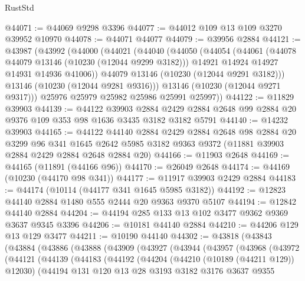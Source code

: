 \begin{lexlean}{RustStd}
\begin{coremodule}
@44071 := @44069 @9298 @3396
@44077 := @44012 @109 @13 @109 @3270 @39952 @10970
@44078 := @44071 @44077
@44079 := @39956 @2884
@44121 := @43987
    (@43992
      (@44000
        (@44021
          (@44040
            (@44050
              (@44054
                (@44061
                  (@44078 @44079 @13146 (@10230 (@12044 @9299 @3182)))
                  @14921
                  @14924
                  @14927
                  @14931
                  @14936
                  @41006))
              @44079
              @13146
              (@10230 (@12044 @9291 @3182)))
            @13146
            (@10230 (@12044 @9281 @9316)))
          @13146
          (@10230 (@12044 @9271 @9317)))
        @25976
        @25979
        @25982
        @25986
        @25991
        @25997))
@44122 := @11829 @39903
@44139 := @44122
    @39903
    @2884
    @2429
    @2884
    @2648
    @99
    @2884
    @20
    @9376
    @109
    @353
    @98
    @1636
    @3435
    @3182
    @3182
    @5791
@44140 := @14232 @39903
@44165 := @44122
    @44140
    @2884
    @2429
    @2884
    @2648
    @98
    @2884
    @20
    @3299
    @96
    @341
    @1645
    @2642
    @5985
    @3182
    @9363
    @9372
    (@11881 @39903 @2884 @2429 @2884 @2648 @2884 @20)
@44166 := @11903 @2648
@44169 := @44165 (@11891 (@44166 @96))
@44170 := @26049 @2648
@44174 := @44169 (@10230 (@44170 @98 @341))
@44177 := @11917 @39903 @2429 @2884
@44183 := @44174 (@10114 (@44177 @341 @1645 @5985 @3182))
@44192 := @12823 @44140 @2884 @1480 @555 @2444 @20 @9363 @9370 @5107
@44194 := @12842 @44140 @2884
@44204 := @44194 @285 @133 @13 @102 @3477 @9362 @9369 @3637 @9345 @3396
@44206 := @10181 @44140 @2884
@44210 := @44206 @129 @13 @129 @3477
@44211 := @10190 @44140
@44302 := @43818
    (@43843
      (@43884
        (@43886
          (@43888
            (@43909
              (@43927
                (@43944
                  (@43957
                    (@43968
                      (@43972
                        (@44121
                          (@44139
                            (@44183
                              (@44192
                                (@44204
                                  (@44210 (@10189 (@44211 @129)) @12030)
                                  (@44194
                                    @131
                                    @120
                                    @13
                                    @28
                                    @3193
                                    @3182
                                    @3176
                                    @3637
                                    @9355

\end{coremodule}
\end{lexlean}
